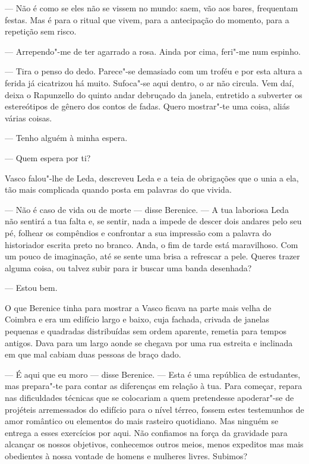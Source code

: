 --- Não é como se eles não se vissem no mundo: saem, vão aos bares,
  frequentam festas. Mas é para o ritual que vivem, para a antecipação
  do momento, para a repetição sem risco.

--- Arrependo"-me de ter agarrado a rosa. Ainda por cima, feri"-me num
  espinho.

--- Tira o penso do dedo. Parece"-se demasiado com um troféu e por esta
altura a ferida já cicatrizou há muito. Sufoca"-se aqui dentro, o ar
não circula. Vem daí, deixa o Rapunzello do quinto
andar debruçado da janela, entretido a subverter os estereótipos de
gênero dos contos de fadas. Quero mostrar"-te uma coisa, aliás várias
coisas.

--- Tenho alguém à minha espera.

--- Quem espera por ti?


Vasco falou"-lhe de Leda, descreveu Leda e a teia de obrigações que o
unia a ela, tão mais complicada quando posta em palavras do que vivida.

--- Não é caso de vida ou de morte --- disse Berenice. --- A tua laboriosa
  Leda não sentirá a tua falta e, se sentir, nada a impede de descer
  dois andares pelo seu pé, folhear os compêndios e confrontar a sua
  impressão com a palavra do historiador escrita preto no branco.
  Anda, o fim de tarde está maravilhoso. Com um pouco de imaginação,
  até se sente uma brisa a refrescar a pele. Queres trazer alguma coisa,
  ou talvez subir para ir buscar uma banda desenhada?

--- Estou bem.


O que Berenice tinha para mostrar a Vasco ficava na parte mais velha de
Coimbra e era um edifício largo e baixo, cuja fachada, crivada de
janelas pequenas e quadradas distribuídas sem ordem aparente, remetia
para tempos antigos. Dava para um largo aonde se chegava por uma rua
estreita e inclinada em que mal cabiam duas pessoas de braço dado.

--- É aqui que eu moro --- disse Berenice. --- Esta é uma república de
  estudantes, mas prepara"-te para contar as diferenças em relação à
  tua. Para começar, repara nas dificuldades
técnicas que se colocariam a quem pretendesse apoderar"-se de projéteis
arremessados do edifício para o nível térreo, fossem estes testemunhos
de amor romântico ou elementos do mais rasteiro quotidiano. Mas ninguém
se entrega a esses exercícios por aqui. Não confiamos na força da
gravidade para alcançar os nossos objetivos, conhecemos outros meios,
menos expeditos mas mais obedientes à nossa vontade de homens e mulheres livres. Subimos?

